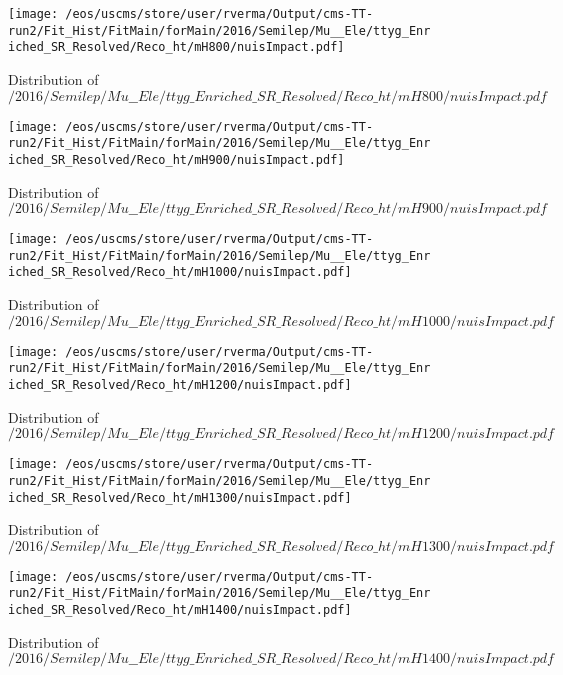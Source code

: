 \begin{figure}
\centering
\texttt{[image: /eos/uscms/store/user/rverma/Output/cms-TT-run2/Fit\_Hist/FitMain/forMain/2016/Semilep/Mu\_\_Ele/ttyg\_Enriched\_SR\_Resolved/Reco\_ht/mH800/nuisImpact.pdf]}
\caption{Distribution of $/2016/Semilep/Mu\_\_Ele/ttyg\_Enriched\_SR\_Resolved/Reco\_ht/mH800/nuisImpact.pdf$}
\end{figure}

\begin{figure}
\centering
\texttt{[image: /eos/uscms/store/user/rverma/Output/cms-TT-run2/Fit\_Hist/FitMain/forMain/2016/Semilep/Mu\_\_Ele/ttyg\_Enriched\_SR\_Resolved/Reco\_ht/mH900/nuisImpact.pdf]}
\caption{Distribution of $/2016/Semilep/Mu\_\_Ele/ttyg\_Enriched\_SR\_Resolved/Reco\_ht/mH900/nuisImpact.pdf$}
\end{figure}

\begin{figure}
\centering
\texttt{[image: /eos/uscms/store/user/rverma/Output/cms-TT-run2/Fit\_Hist/FitMain/forMain/2016/Semilep/Mu\_\_Ele/ttyg\_Enriched\_SR\_Resolved/Reco\_ht/mH1000/nuisImpact.pdf]}
\caption{Distribution of $/2016/Semilep/Mu\_\_Ele/ttyg\_Enriched\_SR\_Resolved/Reco\_ht/mH1000/nuisImpact.pdf$}
\end{figure}

\begin{figure}
\centering
\texttt{[image: /eos/uscms/store/user/rverma/Output/cms-TT-run2/Fit\_Hist/FitMain/forMain/2016/Semilep/Mu\_\_Ele/ttyg\_Enriched\_SR\_Resolved/Reco\_ht/mH1200/nuisImpact.pdf]}
\caption{Distribution of $/2016/Semilep/Mu\_\_Ele/ttyg\_Enriched\_SR\_Resolved/Reco\_ht/mH1200/nuisImpact.pdf$}
\end{figure}

\begin{figure}
\centering
\texttt{[image: /eos/uscms/store/user/rverma/Output/cms-TT-run2/Fit\_Hist/FitMain/forMain/2016/Semilep/Mu\_\_Ele/ttyg\_Enriched\_SR\_Resolved/Reco\_ht/mH1300/nuisImpact.pdf]}
\caption{Distribution of $/2016/Semilep/Mu\_\_Ele/ttyg\_Enriched\_SR\_Resolved/Reco\_ht/mH1300/nuisImpact.pdf$}
\end{figure}

\begin{figure}
\centering
\texttt{[image: /eos/uscms/store/user/rverma/Output/cms-TT-run2/Fit\_Hist/FitMain/forMain/2016/Semilep/Mu\_\_Ele/ttyg\_Enriched\_SR\_Resolved/Reco\_ht/mH1400/nuisImpact.pdf]}
\caption{Distribution of $/2016/Semilep/Mu\_\_Ele/ttyg\_Enriched\_SR\_Resolved/Reco\_ht/mH1400/nuisImpact.pdf$}
\end{figure}

